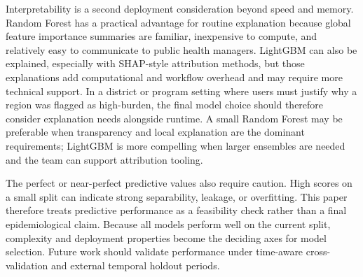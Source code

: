 \documentclass[11pt]{article}
\begin{document}
Interpretability is a second deployment consideration beyond speed and memory. Random Forest has a practical advantage for routine explanation because global feature importance summaries are familiar, inexpensive to compute, and relatively easy to communicate to public health managers. LightGBM can also be explained, especially with SHAP-style attribution methods, but those explanations add computational and workflow overhead and may require more technical support. In a district or program setting where users must justify why a region was flagged as high-burden, the final model choice should therefore consider explanation needs alongside runtime. A small Random Forest may be preferable when transparency and local explanation are the dominant requirements; LightGBM is more compelling when larger ensembles are needed and the team can support attribution tooling.

The perfect or near-perfect predictive values also require caution. High scores on a small split can indicate strong separability, leakage, or overfitting. This paper therefore treats predictive performance as a feasibility check rather than a final epidemiological claim. Because all models perform well on the current split, complexity and deployment properties become the deciding axes for model selection. Future work should validate performance under time-aware cross-validation and external temporal holdout periods.
\end{document}
